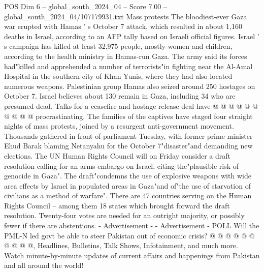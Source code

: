 \begin{textsample}{POS Dim 6 – global\_south\_2024\_04 – Score 7.00 – global\_south\_2024\_04/107179931.txt}
Mass protests The bloodiest-ever Gaza war erupted with Hamas ' s October 7 attack, which resulted in about 1,160 deaths in Israel, according to an AFP tally based on Israeli official figures.
Israel ' s campaign has killed at least 32,975 people, mostly women and children, according to the health ministry in Hamas-run Gaza.
The army said its forces had"killed and apprehended a number of terrorists"in fighting near the Al-Amal Hospital in the southern city of Khan Yunis, where they had also located numerous weapons.
Palestinian group Hamas also seized around 250 hostages on October 7.
Israel believes about 130 remain in Gaza, including 34 who are presumed dead.
Talks for a ceasefire and hostage release deal have @ @ @ @ @ @ @ @ @ @ procrastinating.
The families of the captives have staged four straight nights of mass protests, joined by a resurgent anti-government movement.
Thousands gathered in front of parliament Tuesday, with former prime minister Ehud Barak blaming Netanyahu for the October 7"disaster"and demanding new elections.
The UN Human Rights Council will on Friday consider a draft resolution calling for an arms embargo on Israel, citing the"plausible risk of genocide in Gaza".
The draft"condemns the use of explosive weapons with wide area effects by Israel in populated areas in Gaza"and of"the use of starvation of civilians as a method of warfare".
There are 47 countries serving on the Human Rights Council -- among them 18 states which brought forward the draft resolution.
Twenty-four votes are needed for an outright majority, or possibly fewer if there are abstentions. - Advertisement - - Advertisement - POLL Will the PML-N led govt be able to steer Pakistan out of economic crisis? @ @ @ @ @ @ @ @ @ @, Headlines, Bulletins, Talk Shows, Infotainment, and much more.
Watch minute-by-minute updates of current affairs and happenings from Pakistan and all around the world!

\end{textsample}

